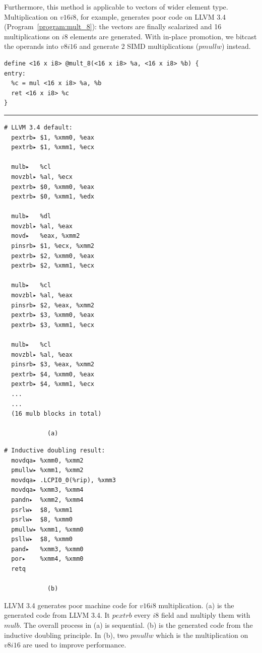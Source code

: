Furthermore, this method is applicable to vectors of wider element type. Multiplication on $v16i8$, for example, generates poor code on LLVM 3.4 (Program~\ref{program:mult_8}): the vectors are finally scalarized and 16 multiplications on $i8$ elements are generated. With in-place promotion, we bitcast the operands into $v8i16$ and generate 2 SIMD multiplications ($pmullw$) instead.

\begin{program}
\begin{verbatim}
define <16 x i8> @mult_8(<16 x i8> %a, <16 x i8> %b) {
entry:
  %c = mul <16 x i8> %a, %b
  ret <16 x i8> %c
}
\end{verbatim}
\rule{\textwidth}{1pt}

\begin{multicols}{2}
\begin{verbatim}
# LLVM 3.4 default:
  pextrb▸ $1, %xmm0, %eax
  pextrb▸ $1, %xmm1, %ecx

  mulb▸   %cl
  movzbl▸ %al, %ecx
  pextrb▸ $0, %xmm0, %eax
  pextrb▸ $0, %xmm1, %edx

  mulb▸   %dl
  movzbl▸ %al, %eax
  movd▸   %eax, %xmm2
  pinsrb▸ $1, %ecx, %xmm2
  pextrb▸ $2, %xmm0, %eax
  pextrb▸ $2, %xmm1, %ecx

  mulb▸   %cl
  movzbl▸ %al, %eax
  pinsrb▸ $2, %eax, %xmm2
  pextrb▸ $3, %xmm0, %eax
  pextrb▸ $3, %xmm1, %ecx

  mulb▸   %cl
  movzbl▸ %al, %eax
  pinsrb▸ $3, %eax, %xmm2
  pextrb▸ $4, %xmm0, %eax
  pextrb▸ $4, %xmm1, %ecx
  ...
  ...
  (16 mulb blocks in total)

            (a)
\end{verbatim}
\columnbreak
\begin{verbatim}
# Inductive doubling result:
  movdqa▸ %xmm0, %xmm2
  pmullw▸ %xmm1, %xmm2
  movdqa▸ .LCPI0_0(%rip), %xmm3
  movdqa▸ %xmm3, %xmm4
  pandn▸  %xmm2, %xmm4
  psrlw▸  $8, %xmm1
  psrlw▸  $8, %xmm0
  pmullw▸ %xmm1, %xmm0
  psllw▸  $8, %xmm0
  pand▸   %xmm3, %xmm0
  por▸    %xmm4, %xmm0
  retq

            (b)
\end{verbatim}
\end{multicols}
\caption[Comparison of the compiled machine code of $v16i8$ multiplication between LLVM 3.4 and the inductive doubling principle.]{LLVM 3.4 generates poor machine code for $v16i8$ multiplication. (a) is the generated code from LLVM 3.4. It $pextrb$ every $i8$ field and multiply them with $mulb$. The overall process in (a) is sequential. (b) is the generated code from the inductive doubling principle. In (b), two $pmullw$ which is the multiplication on $v8i16$ are used to improve performance.}
\label{program:mult_8}
\end{program}

